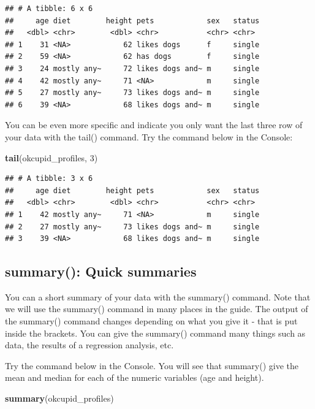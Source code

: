 \documentclass[
]{krantz}
\makeatletter
\newenvironment{Shaded}{\begin{snugshade}}{\end{snugshade}}
\newcommand{\DecValTok}[1]{\textcolor[rgb]{0.06,0.06,0.06}{#1}}
\newcommand{\KeywordTok}[1]{\textcolor[rgb]{0.27,0.27,0.27}{\textbf{#1}}}
\newcommand{\NormalTok}[1]{#1}
\newenvironment{kframe}{%
\medskip{}
\setlength{\fboxsep}{.8em}
 \def\at@end@of@kframe{}%
 \ifinner\ifhmode%
  \def\at@end@of@kframe{\end{minipage}}%
  \begin{minipage}{\columnwidth}%
 \fi\fi%
 \def\FrameCommand##1{\hskip\@totalleftmargin \hskip-\fboxsep
 \colorbox{shadecolor}{##1}\hskip-\fboxsep
     \hskip-\linewidth \hskip-\@totalleftmargin \hskip\columnwidth}%
 \MakeFramed {\advance\hsize-\width
   \@totalleftmargin\z@ \linewidth\hsize
   \@setminipage}}%
 {\par\unskip\endMakeFramed%
 \at@end@of@kframe}
\renewenvironment{Shaded}{\begin{kframe}}{\end{kframe}}
\makeatother
\begin{document}
\begin{verbatim}
## # A tibble: 6 x 6
##     age diet        height pets            sex   status
##   <dbl> <chr>        <dbl> <chr>           <chr> <chr> 
## 1    31 <NA>            62 likes dogs      f     single
## 2    59 <NA>            62 has dogs        f     single
## 3    24 mostly any~     72 likes dogs and~ m     single
## 4    42 mostly any~     71 <NA>            m     single
## 5    27 mostly any~     73 likes dogs and~ m     single
## 6    39 <NA>            68 likes dogs and~ m     single
\end{verbatim}

You can be even more specific and indicate you only want the last three row of your data with the tail() command. Try the command below in the Console:

\begin{Shaded}
\begin{Highlighting}[]
\KeywordTok{tail}\NormalTok{(okcupid_profiles, }\DecValTok{3}\NormalTok{)}
\end{Highlighting}
\end{Shaded}

\begin{verbatim}
## # A tibble: 3 x 6
##     age diet        height pets            sex   status
##   <dbl> <chr>        <dbl> <chr>           <chr> <chr> 
## 1    42 mostly any~     71 <NA>            m     single
## 2    27 mostly any~     73 likes dogs and~ m     single
## 3    39 <NA>            68 likes dogs and~ m     single
\end{verbatim}

\hypertarget{summary-quick-summaries}{%
\subsection{summary(): Quick summaries}\label{summary-quick-summaries}}

You can a short summary of your data with the summary() command. Note that we will use the summary() command in many places in the guide. The output of the summary() command changes depending on what you give it - that is put inside the brackets. You can give the summary() command many things such as data, the results of a regression analysis, etc.

Try the command below in the Console. You will see that summary() give the mean and median for each of the numeric variables (age and height).

\begin{Shaded}
\begin{Highlighting}[]
\KeywordTok{summary}\NormalTok{(okcupid_profiles)}
\end{Highlighting}
\end{Shaded}
\end{document}
